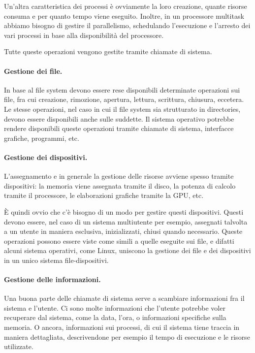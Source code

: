         Un'altra caratteristica dei processi è ovviamente la loro creazione, quante risorse consuma e per quanto tempo viene eseguito. Inoltre, in un processore multitask abbiamo bisogno di gestire il parallelismo, schedulando l'esecuzione e l'arresto dei vari processi in base alla disponibilità del processore.
        
        Tutte queste operazioni vengono gestite tramite chiamate di sistema.
        
        \paragraph{Gestione dei file.} In base al file system devono essere rese disponibili determinate operazioni sui file, fra cui creazione, rimozione, apertura, lettura, scrittura, chiusura, eccetera. Le stesse operazioni, nel caso in cui il file system sia strutturato in directories, devono essere disponibili anche sulle suddette. Il sistema operativo potrebbe rendere disponibili queste operazioni tramite chiamate di sistema, interfacce grafiche, programmi, etc.
        
        \paragraph{Gestione dei dispositivi.} L'assegnamento e in generale la gestione delle risorse avviene spesso tramite dispositivi: la memoria viene assegnata tramite il disco, la potenza di calcolo tramite il processore, le elaborazioni grafiche tramite la GPU, etc.
        
        È quindi ovvio che c'è bisogno di un modo per gestire questi dispositivi. Questi devono essere, nel caso di un sistema multiutente per esempio, assegnati talvolta a un utente in maniera esclusiva, inizializzati, chiusi quando necessario. Queste operazioni possono essere viste come simili a quelle eseguite sui file, e difatti alcuni sistema operativi, come Linux, uniscono la gestione dei file e dei dispositivi in un unico sistema file-dispositivi.
        
        \paragraph{Gestione delle informazioni.} Una buona parte delle chiamate di sistema serve a scambiare informazioni fra il sistema e l'utente. Ci sono molte informazioni che l'utente potrebbe voler recuperare dal sistema, come la data, l'ora, o informazioni specifiche sulla memoria. O ancora, informazioni sui processi, di cui il sistema tiene traccia in maniera dettagliata, descrivendone per esempio il tempo di esecuzione e le risorse utilizzate.
        
